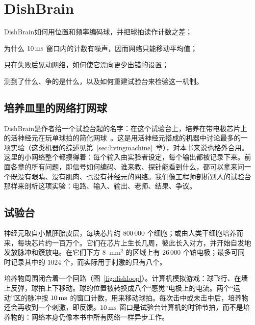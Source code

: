 \chapter{DishBrain}
\label{sec:dishbrain}
\begin{chaptergoals}
\item DishBrain如何用位置和频率编码球，并把球拍读作计数之差；
\item 为什么 $10\,\text{ms}$ 窗口内的计数有噪声，因而网络只能移动平均值；
\item 只在失败后晃动网络，如何使它漂向更少出错的设置；
\item 测到了什么、争的是什么，以及如何重建试验台来检验这一机制。
\end{chaptergoals}

\section{培养皿里的网络打网球}

DishBrain是作者给一个试验台起的名字：在这个试验台上，培养在带电极芯片上的活神经元在玩单球拍的简化网球~\cite{Kagan2022}。这是用活神经元搭成的机器中讨论最多的一项实验（这类机器的综述见第~\ref{sec:livingmachine}~章），对本书来说也格外合用。这里的小网络整个都摸得着：每个输入由实验者设定，每个输出都被记录下来。前面各章的所有问题，即信号如何编码、谁来教、探针能看到什么，都可以拿来问一个既没有眼睛、没有肌肉、也没有神经元的网络。我们像工程师剖析别人的试验台那样来剖析这项实验：电路、输入、输出、老师、结果、争议。

\section{试验台}

神经元取自小鼠胚胎皮层，每块芯片约 $800\,000$ 个细胞；或由人类干细胞培养而来，每块芯片约一百万个。它们在芯片上生长几周，彼此长入对方，并开始自发地发放脉冲和簇放电。在它们下方 $8$~mm$^2$ 的区域上有 $26\,000$ 个铂电极；最多可同时记录其中的 $1024$ 个，而实际用于刺激的只有八个。

培养物周围闭合着一个回路（图~\ref{fig:dishloop}）。计算机模拟游戏：球飞行、在墙上反弹，球拍上下移动。球的位置被转换成八个“感觉”电极上的电流。两个“运动”区的脉冲按 $10\,\text{ms}$ 的窗口计数，用来移动球拍。每次击中或未击中后，培养物还会再收到一个刺激，即反馈。$10\,\text{ms}$ 窗口是试验台计算机的时钟节拍，而不是培养物的：网络本身仍像本书中所有网络一样异步工作。

